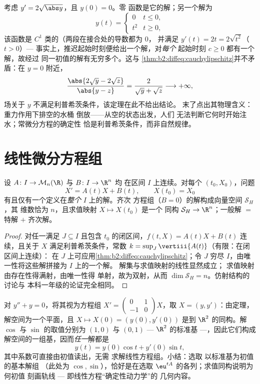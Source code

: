 \begin{example}\label{ex:b2:diffeq:leaky}
考虑 $y' = 2\sqrt{\abs y}$，且 $y(0) = 0$。零
函数是它的解；另一个解为
\[
y(t) = \begin{cases} 0 & t \leq 0,\\ t^2 & t \geq 0,
\end{cases}
\]
该函数是 $C^1$ 类的（两段在接合处的导数都为 $0$，
并满足 $y'(t) = 2t = 2\sqrt{t^2}$（$t > 0$）---
事实上，推迟起始时刻便给出一个解，对\emph{每个}
起始时刻 $c \geq 0$ 都有一个解，故经过
同一初值的解有无穷多个。这与
\cref{thm:b2:diffeq:cauchylipschitz}并不矛盾：在 $y = 0$ 附近，
\[
\frac{\abs{2\sqrt y - 2\sqrt z}}{\abs{y - z}}
= \frac{2}{\sqrt y + \sqrt z} \longrightarrow +\infty ,
\]
场关于 $y$ 不满足利普希茨条件，该定理在此不给出结论。
末了点出其物理含义：重力作用下排空的水桶
倒放——从空的状态出发，人们
无法判断它何时开始注水；常微分方程的确定性
恰是利普希茨条件，而非自然规律。
\end{example}

\section{线性微分方程组}

\begin{theorem}[线性微分方程组的结构]\label{thm:b2:diffeq:linear}
设 $A \colon I \to \mathcal{M}_n(\R)$ 与 $B \colon I \to \R^n$ 均
在区间 $I$ 上连续。对每个 $(t_0, X_0)$，问题
\[
X' = A(t)X + B(t), \qquad X(t_0) = X_0
\]
有且仅有一个定义在\emph{整个} $I$ 上的解。齐次
方程组（$B = 0$）的解构成向量空间 $\mathcal{S}_H$，其
维数恰为 $n$，且求值映射 $X \mapsto X(t_0)$ 是一个
同构 $\mathcal{S}_H \to \R^n$；一般解 $=$
特解 $+$ 齐次解。
\end{theorem}

\begin{proof}
对任一满足 $J \subseteq I$ 且包含 $t_0$ 的闭区间，$f(t, X) =
A(t)X + B(t)$ 连续，且关于 $X$ 满足利普希茨条件，常数 $k
= \sup_J \vertiii{A(t)}$（有限：在闭区间上连续）：
在 $J$ 上可应用\cref{thm:b2:diffeq:cauchylipschitz}；令 $J$
穷尽 $I$，由唯一性将这些解拼接为 $I$ 上的一个解。
解集与求值映射的线性显然成立；
求值映射由存在性得满射，由唯一性得
单射，故为双射，从而 $\dim \mathcal{S}_H = n$。仿射结构的讨论与
本科一年级的论证完全相同。
\end{proof}

\begin{example}[求值同构的具体形式]\label{ex:b2:diffeq:evaliso}
对 $y'' + y = 0$，将其视为方程组 $X' =
\begin{pmatrix} 0 & 1\\ -1 & 0\end{pmatrix}X$，取 $X = (y,
y')$：由定理，解空间为一个平面，且
$X \mapsto X(0) = (y(0), y'(0))$ 是到
$\R^2$ 的同构。解 $\cos$ 与 $\sin$ 的取值分别为 $(1, 0)$
与 $(0, 1)$ --- $\R^2$ 的标准基 ---，因此它们构成
解空间的一组基，因而\emph{任一}解都是
\[
y(t) = y(0)\cos t + y'(0)\sin t ,
\]
其中系数可直接由初值读出，无需
求解线性方程组。小结：选取
以标准基为初值的基本解组
（此处为 $\cos, \sin$），恰好是在选取
$\eu^{tA}$ 的各列；求值同构说明为何初值
刻画轨线 --- 即线性方程“确定性动力学”的
几何内容。
\end{example}

